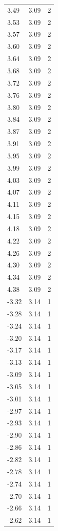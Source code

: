 \begin{longtable}{lrr}
  3.49 & 3.09 & 2 \\
  3.53 & 3.09 & 2 \\
  3.57 & 3.09 & 2 \\
  3.60 & 3.09 & 2 \\
  3.64 & 3.09 & 2 \\
  3.68 & 3.09 & 2 \\
  3.72 & 3.09 & 2 \\
  3.76 & 3.09 & 2 \\
  3.80 & 3.09 & 2 \\
  3.84 & 3.09 & 2 \\
  3.87 & 3.09 & 2 \\
  3.91 & 3.09 & 2 \\
  3.95 & 3.09 & 2 \\
  3.99 & 3.09 & 2 \\
  4.03 & 3.09 & 2 \\
  4.07 & 3.09 & 2 \\
  4.11 & 3.09 & 2 \\
  4.15 & 3.09 & 2 \\
  4.18 & 3.09 & 2 \\
  4.22 & 3.09 & 2 \\
  4.26 & 3.09 & 2 \\
  4.30 & 3.09 & 2 \\
  4.34 & 3.09 & 2 \\
  4.38 & 3.09 & 2 \\
  -3.32 & 3.14 & 1 \\
  -3.28 & 3.14 & 1 \\
  -3.24 & 3.14 & 1 \\
  -3.20 & 3.14 & 1 \\
  -3.17 & 3.14 & 1 \\
  -3.13 & 3.14 & 1 \\
  -3.09 & 3.14 & 1 \\
  -3.05 & 3.14 & 1 \\
  -3.01 & 3.14 & 1 \\
  -2.97 & 3.14 & 1 \\
  -2.93 & 3.14 & 1 \\
  -2.90 & 3.14 & 1 \\
  -2.86 & 3.14 & 1 \\
  -2.82 & 3.14 & 1 \\
  -2.78 & 3.14 & 1 \\
  -2.74 & 3.14 & 1 \\
  -2.70 & 3.14 & 1 \\
  -2.66 & 3.14 & 1 \\
  -2.62 & 3.14 & 1 \\

\end{longtable}
